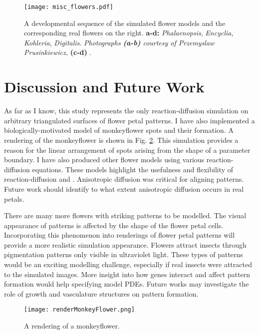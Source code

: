 \begin{figure}[ht]
	\centering
	\texttt{[image: misc\_flowers.pdf]}
	\caption[A developmental sequence of the simulated flower models and the corresponding real flowers]{A developmental sequence of the simulated flower models and the corresponding real flowers on the right. \textbf{a-d:} \textit{Phalaenopsis}, \textit{Encyclia}, \textit{Kohleria}, \textit{Digitalis}. \textit{Photographs \textbf{(a-b)} courtesy of Przemyslaw Prusinkiewicz, }\textbf{(c-d)} .}
	\label{fig:miscFlowers}
\end{figure}

\section{Discussion and Future Work}
As far as I know, this study represents the only reaction-diffusion simulation on arbitrary triangulated surfaces of flower petal patterns. I have also implemented a biologically-motivated model of monkeyflower spots and their formation. A rendering of the monkeyflower is shown in Fig. \ref{fig:monkeyFlowerRendering}. This simulation provides a reason for the linear arrangement of spots arising from the shape of a parameter boundary. I have also produced other flower models using various reaction-diffusion equations. These models highlight the usefulness and flexibility of reaction-diffusion and \ProgramName{}. Anisotropic diffusion was critical for aligning patterns. Future work should identify to what extent anisotropic diffusion occurs in real petals.

There are many more flowers with striking patterns to be modelled. The visual appearance of patterns is affected by the shape of the flower petal cells. Incorporating this phenomenon into renderings of flower petal patterns will provide a more realistic simulation appearance. Flowers attract insects through pigmentation patterns only visible in ultraviolet light. These types of patterns would be an exciting modelling challenge, especially if real insects were attracted to the simulated images. More insight into how genes interact and affect pattern formation would help specifying model PDEs. Future works may investigate the role of growth and vasculature structures on pattern formation. 

\begin{figure}[ht]
	\centering
	\texttt{[image: renderMonkeyFlower.png]}
	\caption[A rendering of a monkeyflower]{A rendering of a monkeyflower.}
	\label{fig:monkeyFlowerRendering}
\end{figure}
